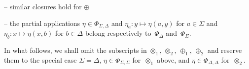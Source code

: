 \noindent -- 
similar closures hold for $\oplus$

\noindent -- 
the partial applications $\eta \in \Phi_{\Sigma, \Delta}$
and $\eta_a: y \mapsto \eta(a, y)$ for $a \in \Sigma$ %
and\\ 
\phantom{--} $\eta_b: x \mapsto \eta(x, b)$ for $b \in \Delta$ %
belong respectively to~$\Phi_\Delta$ and~$\Phi_\Sigma$.

\medskip\noindent
In what follows, we shall omit the subscripts in 
$\otimes_1$, $\otimes_2$, $\oplus_1$, $\oplus_2$
and reserve them to the special case $\Sigma = \Delta$,
\ie $\eta \in \Phi_{\Sigma, \Sigma}$ for~$\otimes_1$ above,
and $\eta \in \Phi_{\Delta, \Delta}$ for~$\otimes_2$. 

%

